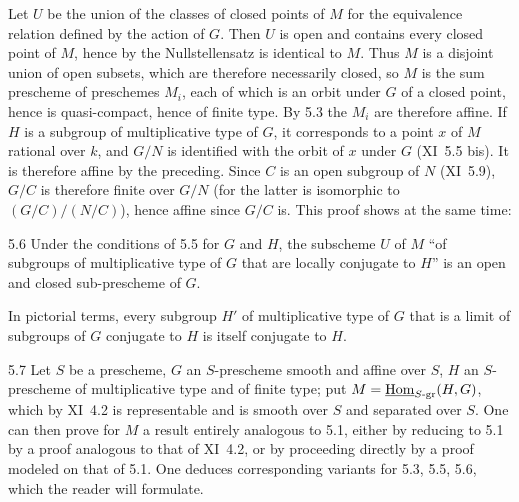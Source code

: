 Let $U$ be the union of the classes of closed points of $M$ for the equivalence relation defined by the action of $G$. Then $U$ is open and contains every closed point of $M$, hence by the Nullstellensatz is identical to $M$. Thus $M$ is a disjoint union of open subsets, which are therefore necessarily closed, so $M$ is the sum prescheme of preschemes $M_i$, each of which is an orbit under $G$ of a closed point, hence is quasi-compact, hence of finite type. By 5.3 the $M_i$ are therefore affine. If $H$ is a subgroup of multiplicative type of $G$, it corresponds to a point $x$ of $M$ rational over $k$, and $G/N$ is identified with the orbit of $x$ under $G$ (XI~5.5 bis). It is therefore affine by the preceding. Since $C$ is an open subgroup of $N$ (XI~5.9), $G/C$ is therefore finite over $G/N$ (for the latter is isomorphic to $(G/C)/(N/C)$), hence affine since $G/C$ is. This proof shows at the same time:
\begin{corollary}{5.6}\label{XII.5.6}
Under the conditions of 5.5 for $G$ and $H$, the subscheme $U$ of $M$ ``of subgroups of multiplicative type of $G$ that are locally conjugate to $H$'' is an open and closed sub-prescheme of $G$.
\end{corollary}
In pictorial terms, every subgroup $H'$ of multiplicative type of $G$ that is a limit of subgroups of $G$ conjugate to $H$ is itself conjugate to $H$.
\begin{remarks}{5.7}\label{XII.5.7}
Let $S$ be a prescheme, $G$ an $S$-prescheme smooth and affine over $S$, $H$ an $S$-prescheme of multiplicative type and of finite type; put $M=\underline{\operatorname{Hom}}_{S\text{-gr}}(H,G)$, which by XI~4.2 is representable and is smooth over $S$ and separated over $S$. One can then prove for $M$ a result entirely analogous to 5.1, either by reducing to 5.1 by a proof analogous to that of XI~4.2, or by proceeding directly by a proof modeled on that of 5.1. One deduces corresponding variants for 5.3, 5.5, 5.6, which the reader will formulate.
\end{remarks}

